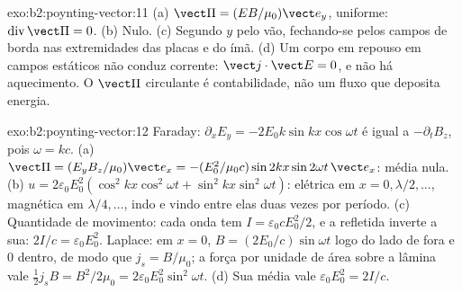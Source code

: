 \begin{solution}{exo:b2:poynting-vector:11}
(a) $\vect\Pi = (EB/\mu_0)\vect e_y$, uniforme: $\operatorname{div}\vect\Pi = 0$. (b) Nulo.
(c) Segundo $y$ pelo vão, fechando-se pelos campos de borda nas
extremidades das placas e do ímã. (d) Um corpo em repouso em campos
estáticos não conduz corrente: $\vect j\cdot\vect E = 0$, e não há aquecimento. O
$\vect\Pi$ circulante é contabilidade, não um fluxo que deposita energia.
\end{solution}

\begin{solution}{exo:b2:poynting-vector:12}
Faraday: $\partial_xE_y = -2E_0k\sin kx\cos\omega t$ é igual a $-\partial_tB_z$, pois
$\omega = kc$. (a)
$\vect\Pi = (E_yB_z/\mu_0)\vect e_x = -(E_0^2/\mu_0c)\sin2kx\sin2\omega t\,\vect e_x$: média
nula. (b) $u = 2\varepsilon_0E_0^2(\cos^2kx\cos^2\omega t + \sin^2kx\sin^2\omega t)$: elétrica
em $x = 0, \lambda/2, \dots$, magnética em $\lambda/4, \dots$, indo e vindo entre elas
duas vezes por período. (c) Quantidade de movimento: cada onda tem $I = \varepsilon_0cE_0^2/2$, e a
refletida inverte a sua: $2I/c = \varepsilon_0E_0^2$. Laplace: em $x =
0$, $B = (2E_0/c)\sin\omega t$ logo do lado de fora e $0$ dentro, de modo que $j_s = B/\mu_0$; a
força por unidade de área sobre a lâmina vale $\tfrac12j_sB = B^2/2\mu_0 = 2\varepsilon_0E_0^2\sin^2
\omega t$. (d) Sua média vale $\varepsilon_0E_0^2 = 2I/c$.
\end{solution}

